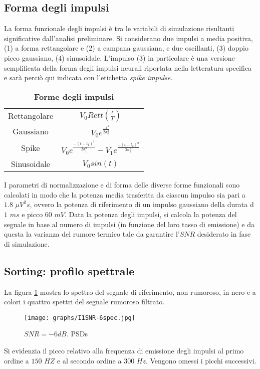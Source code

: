 \documentclass[9pt,twocolumn,twoside]{osajnl}
\begin{document}
\subsection{Forma degli impulsi}

La forma funzionale degli impulsi è tra le variabili di simulazione risultanti significative dall'analisi preliminare.
Si considerano due impulsi a media positiva, (1) a forma rettangolare e (2) a campana gaussiana, e due oscillanti, (3) doppio picco gaussiano, (4) sinusoidale. L'impulso (3) in particolare è una versione semplificata della forma degli impulsi neurali riportata nella letteratura specifica e sarà perciò qui indicata con l'etichetta {\it spike impulse}.

\begin{table}[htbp]
\centering
\caption{\bf Forme degli impulsi}
\begin{tabular}{cc}
\hline
Rettangolare    & $V_{0}Rett(\frac{t}{T})$ \\
Gaussiano       & $V_{0}e^{\frac{-t^{2}}{2\sigma_{0}^{2}}}$ \\
Spike           & $V_{0}e^{\frac{-(t-t_{1})^{2}}{2\sigma_{1}^{2}}} 
                   -V_{1}e^{\frac{-(t-t_{2})^{2}}{2\sigma_{2}^{2}}}$ \\
Sinusoidale       & $V_{0}sin(t)$ \\
\hline
\end{tabular}
\label{tab:forme}
\end{table}

I parametri di normalizzazione e di forma delle diverse forme funzionali sono calcolati in modo che la potenza media trasferita da ciascun impulso sia pari a $1.8$ $\mu V^{2}s$, ovvero la potenza di riferimento di un impulso gaussiano della durata d $1$ $ms$ e picco $60$ $mV$.
Data la potenza degli impulsi, si calcola la potenza del segnale in base al numero di impulsi (in funzione del loro tasso di emissione) e da questa la varianza del rumore termico tale da garantire l'$SNR$ desiderato in fase di simulazione.



\subsection{Sorting: profilo spettrale}

La figura \ref{fig:c9_I5SNR4spec} mostra lo spettro del segnale di riferimento, non rumoroso, in nero e a colori i quattro spettri del segnale rumoroso filtrato.
%
\begin{figure}[htbp]
\centering
\texttt{[image: graphs/I1SNR-6spec.jpg]}
\caption{$SNR = -6dB$. PSDs}
\label{fig:c9_I5SNR4spec}
\end{figure}
%
Si evidenzia il picco relativo alla frequenza di emissione degli impulsi al primo ordine a $150$ $HZ$ e al secondo ordine a $300$ $Hz$. Vengono omessi i picchi successivi. 
\end{document}

